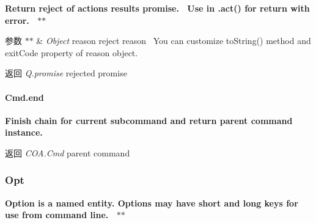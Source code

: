 {\bfseries {\bfseries {\bfseries {\bfseries {\bfseries {\bfseries  Return reject of actions results promise.~\newline
 Use in .act() for return with error.~\newline
 $\ast$$\ast$
\begin{DoxyParams}{参数}
{\em $\ast$$\ast$} & {\itshape Object} {\ttfamily reason} reject reason~\newline
 You can customize to\+String() method and exit\+Code property of reason object.~\newline
 {\bfseries }\\
\hline
\end{DoxyParams}
\begin{DoxyReturn}{返回}
{\bfseries } {\itshape Q.\+promise} rejected promise
\end{DoxyReturn}
\paragraph*{Cmd.\+end}}}}}}}

{\bfseries {\bfseries {\bfseries {\bfseries {\bfseries {\bfseries  Finish chain for current subcommand and return parent command instance.~\newline
 {\bfseries \begin{DoxyReturn}{返回}
{\itshape C\+O\+A.\+Cmd} {\ttfamily parent} command
\end{DoxyReturn}
\subsubsection*{Opt}}}}}}}}

{\bfseries {\bfseries {\bfseries {\bfseries {\bfseries {\bfseries {\bfseries  Option is a named entity. Options may have short and long keys for use from command line.~\newline
 $\ast$$\ast$ }}}}}}}